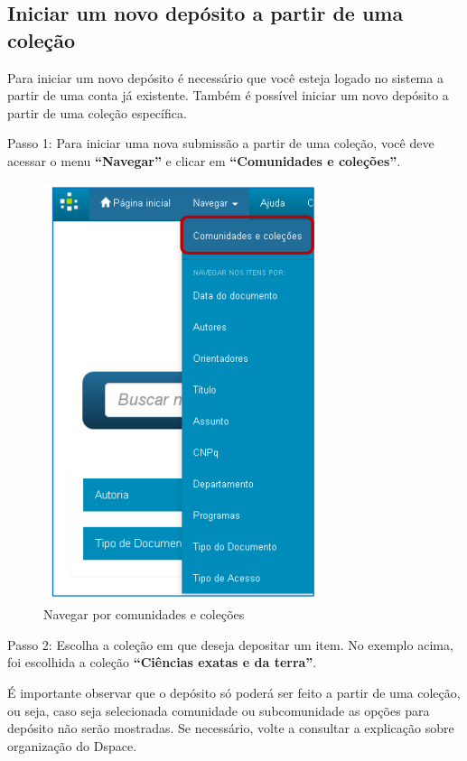 \documentclass[12pt,hidelinks]{article}
\begin{document}
    \subsection{Iniciar um novo depósito a partir de uma coleção}
    
    Para iniciar um novo depósito é necessário que você esteja logado no sistema a partir de uma conta já existente. Também é possível iniciar um novo depósito a partir de uma coleção específica.
    
    \singlespacing
    
    Passo 1: Para iniciar uma nova submissão a partir de uma coleção, você deve acessar o menu \textbf{“Navegar”} e clicar em \textbf{“Comunidades e coleções”}.
    
    \begin{figure}[!htp]
                \centering
                \includegraphics[scale=0.8]{figura/Figura163.png}
                \caption{Navegar por comunidades e coleções}
            \label{Rotulo}
        \end{figure}
    
    Passo 2: Escolha a coleção em que deseja depositar um item. No exemplo acima, foi escolhida a coleção \textbf{“Ciências exatas e da terra”}.

\newpage

    É importante observar que o depósito só poderá ser feito a partir de uma coleção, ou seja, caso seja selecionada comunidade ou subcomunidade as opções para depósito não serão mostradas. Se necessário, volte a consultar a explicação sobre organização do Dspace.
    
\end{document}
